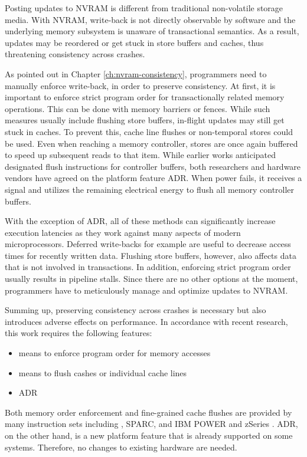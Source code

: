 Posting updates to \ac{NVRAM} is different from traditional non-volatile storage
media. With \ac{NVRAM}, write-back is not directly observable by software and
the underlying memory subsystem is unaware of transactional semantics. As a
result, updates may be reordered or get stuck in store buffers and caches, thus
threatening consistency across crashes.

As pointed out in Chapter \ref{ch:nvram-consistency}, programmers need to
manually enforce write-back, in order to preserve consistency. At first, it is
important to enforce strict program order for transactionally related memory
operations. This can be done with memory barriers or fences. While such measures
usually include flushing store buffers, in-flight updates may still get stuck in
caches. To prevent this, cache line flushes or non-temporal stores could be
used. Even when reaching a memory controller, stores are once again buffered to
speed up subsequent reads to that item. While earlier works anticipated
designated flush instructions for controller buffers, both researchers and
hardware vendors have agreed on the platform feature \ac{ADR}. When power fails,
it receives a signal and utilizes the remaining electrical energy to flush all
memory controller buffers.

With the exception of \ac{ADR}, all of these methods can significantly increase
execution latencies as they work against many aspects of modern microprocessors.
Deferred write-backs for example are useful to decrease access times for
recently written data. Flushing store buffers, however, also affects data that
is not involved in transactions. In addition, enforcing strict program order
usually results in pipeline stalls. Since there are no other options at the
moment, programmers have to meticulously manage and optimize updates to
\ac{NVRAM}.

Summing up, preserving consistency across crashes is necessary but also
introduces adverse effects on performance. In accordance with recent research,
this work requires the following features:

\begin{itemize}
    \item means to enforce program order for memory accesses
    \item means to flush cashes or individual cache lines
    \item \acl{ADR}
\end{itemize}

Both memory order enforcement and fine-grained cache flushes are provided by
many instruction sets including , SPARC, and IBM POWER and zSeries
\cite{mckenney2007memory}. \ac{ADR}, on the other hand, is a new platform
feature that is already supported on some systems. Therefore, no changes to
existing hardware are needed.
